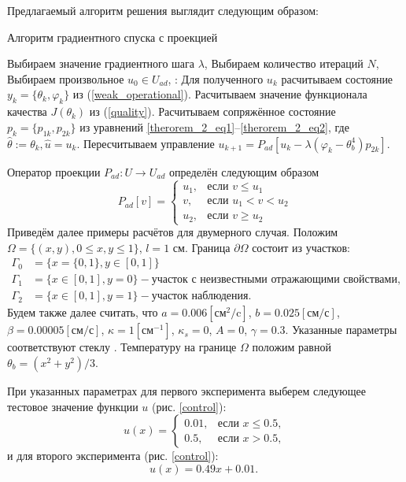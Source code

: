 \documentclass[10pt]{article}
\begin{document}
    Предлагаемый алгоритм решения выглядит следующим образом:
    \begin{algorithm}[H]
        \caption{Алгоритм градиентного спуска с проекцией}
        \begin{algorithmic}[1]
            \State Выбираем значение градиентного шага $\lambda$,
            \State Выбираем количество итераций $N$,
            \State Выбираем произвольное $u_0 \in U_{ad}$,
            :
            \State Для полученного $u_k$ расчитываем состояние $y_k = \{\theta_k, \varphi_k\}$ из  (\ref{weak_operational}).
            \State Расчитываем значение функционала качества $J(\theta_k)$ из (\ref{quality}).
            \State Расчитываем сопряжённое состояние $p_k=\{p_{1k},p_{2k}\}$ из уравнений \eqref{therorem_2_eq1}--\eqref{therorem_2_eq2}, где $ \hat{\theta} := \theta_k, \hat{u}=u_k$.
            \State Пересчитываем управление $u_{k+1} = P_{ad}\left[ u_k - \lambda (\varphi_k - \theta_b^4)p_{2k} \right]$.
            \EndFor
        \end{algorithmic}
    \end{algorithm}
    Оператор проекции $P_{ad} : U \to U_{ad}$ определён следующим образом
    $$
    P_{ad}[v] =
    \begin{cases}
        u_1, & \text{если } v \le u_1 \\
        v, & \text{если } u_1 < v < u_2 \\
        u_2, & \text{если } v \ge u_2
    \end{cases}
    $$
    Приведём далее примеры расчётов для двумерного случая. Положим $\Omega = \{(x,y), 0 \leq x,y \leq 1\}$, $l = 1$ см. Граница $\partial\Omega$ состоит из участков:
    $$
    \begin{aligned}
        \Gamma_0 & = \{x=\{0,1\}, y \in [0,1]\} \\
        \Gamma_1 & = \{x\in [0,1], y=0\} - \text{участок с неизвестными отражающими свойствами,} \\
        \Gamma_2 & = \{x \in [0,1], y=1\} - \text{участок наблюдения.}
    \end{aligned}
    $$
    Будем также далее считать, что $a = 0.006[\text{см}^2/\text{c}]$, $b=0.025[\text{см}/\text{с}]$, $\beta = 0.00005[\text{см}/\text{с}]$, $\kappa=1[\text{см}^{-1}]$, $\kappa_s = 0$, $A = 0$, $\gamma = 0.3$. Указанные параметры соответствуют стеклу \cite{grenkin_13}.
    Температуру на границе $\Omega$ положим равной $\theta_b = (x^2+y^2)/3$.

    При указанных параметрах для первого эксперимента выберем следующее тестовое значение
    функции $u$ (рис. \ref{control}):
    \begin{equation}
        u(x)=
        \begin{cases}
            0.01, & \text{если } x \le 0.5, \\
            0.5, & \text{если } x > 0.5,
        \end{cases}
    \end{equation}
    и для второго эксперимента (рис. \ref{control}):
    \begin{equation}
        \label{test_function_1}
        u(x)=0.49x+0.01. \;
    \end{equation}
\end{document}
